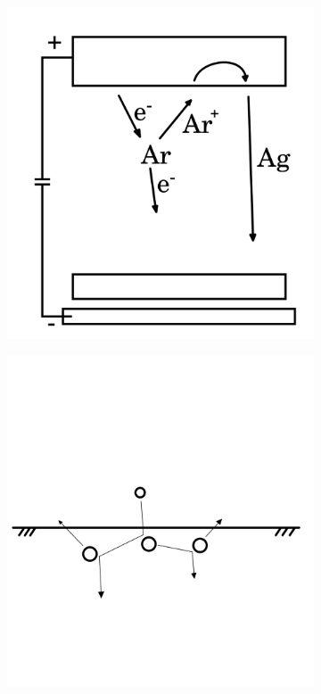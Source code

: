 \begin{figure}[htb]
    \centering
    \begin{subfigure}[t]{.3\textwidth}
        \includegraphics[width=\textwidth]{./Pics/sputter1.png}
        \caption{}
        \label{fig:sputter0}
    \end{subfigure}
    \hspace{1cm}
    \begin{subfigure}[t]{.3\textwidth}
        \includegraphics[width=\textwidth]{./Pics/sputter2.png}

\end{subfigure}
\end{figure}
